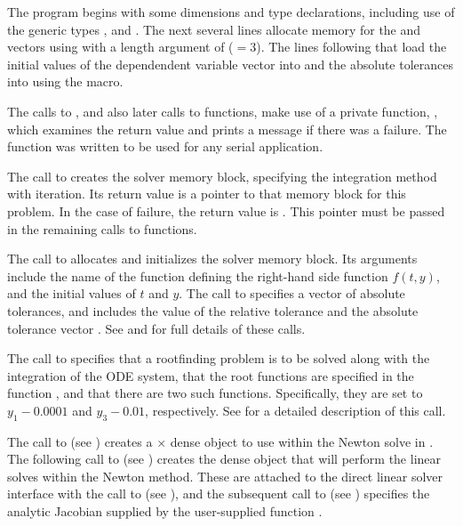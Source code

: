 The  program begins with some dimensions and type declarations,
including use of the generic types ,  and
.  The next several lines 
allocate memory for the  and  vectors using
 with a length argument of  ($= 3$). The
lines following that load the initial values of the dependendent
variable vector into  and the absolute tolerances into 
using the  macro.

The calls to , and also later calls to 
functions, make use of a private function, , which examines
the return value and prints a message if there was a failure.  The
 function was written to be used for any serial {\sundials}
application.

The call to  creates the {\cvode} solver memory block,
specifying the  integration method with  iteration.
Its return value is a pointer to that memory block for this
problem.  In the case of failure, the return value is .  This
pointer must be passed in the remaining calls to {\cvode} functions.

The call to  allocates and initializes the solver memory block.
Its arguments include the name of the {\CC} function  defining the
right-hand side function $f(t,y)$, and the initial values of $t$ and $y$.
The call to  specifies a vector of absolute tolerances,
and includes the value of the relative tolerance  and the absolute 
tolerance vector .  See  and
 for full details of these calls.

The call to  specifies that a rootfinding problem
is to be solved along with the integration of the ODE system, that the
root functions are specified in the function , and that there are
two such functions.  Specifically, they are set to $y_1 - 0.0001$ and 
$y_3 - 0.01$, respectively.
See  for a detailed description of this call.

The call to  (see ) creates
a $\times$ dense {\sunmatrix} object to use within the
Newton solve in {\cvode}.  The following call to
 (see ) creates the 
dense {\sunlinsol} object that will perform the linear solves within
the Newton method.  These are attached to the {\cvdls} direct linear
solver interface with the  call to  (see
), and the subsequent call to
 (see ) specifies the
analytic Jacobian supplied by the user-supplied function .

